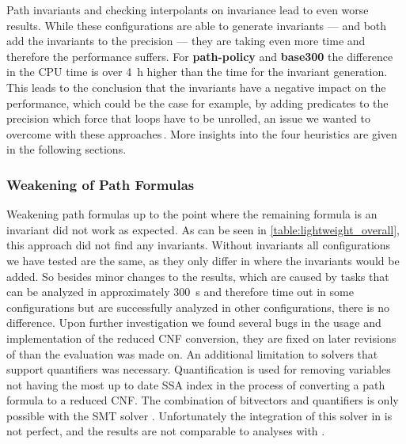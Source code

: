 Path invariants and checking interpolants on invariance lead to even worse results. While these configurations are able to generate invariants --- and both add the invariants to the precision ---
they are taking even more time and therefore the performance suffers. For \textbf{path-policy} and \textbf{base300} the difference in the CPU time is over \SI{4}{\hour} higher than the time for the invariant
generation. This leads to the conclusion that the invariants have a negative impact on the performance, which could be the case for example, by adding predicates
to the precision which force that loops have to be unrolled, an issue we wanted to overcome with these approaches\,.
More insights into the four heuristics are given in the following sections.

\subsubsection*{Weakening of Path Formulas}\label{title:evalWeakening}
Weakening path formulas up to the point where the remaining formula is an invariant did not work as expected. As can be seen in \autoref{table:lightweight_overall}, this approach did not find any 
invariants. Without invariants all configurations we have tested are the same, as they only differ in where the invariants would be added. So besides minor changes to the results, which are caused by tasks
that can be analyzed in approximately \SI{300}{\second} and therefore time out in some configurations but are successfully analyzed in other configurations, there is no difference. Upon further investigation 
we found several bugs in the usage and implementation of the reduced \ac{CNF} conversion, they are fixed on later revisions of \CPAchecker{} than the evaluation was made on. An additional limitation to 
solvers that support quantifiers was necessary. Quantification is used for removing variables not having the most up to date SSA index in the process of converting a path formula to a reduced \ac{CNF}. The 
combination of bitvectors and quantifiers is only possible with the \ac{SMT} solver \ZT{}. Unfortunately the integration of this solver in \CPAchecker{} is not perfect, and the results are not comparable to 
analyses with \MathSAT{}.


